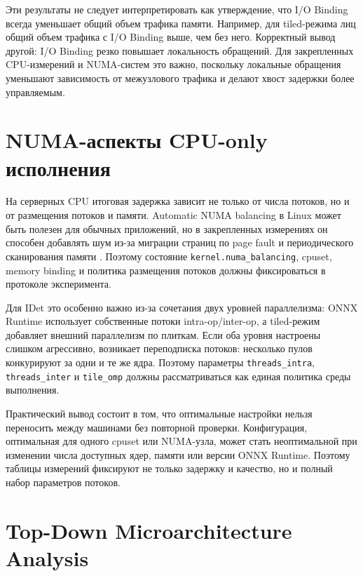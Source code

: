 \documentclass[12pt,a4paper,oneside,openany]{report}
\begin{document}
Эти результаты не следует интерпретировать как утверждение, что I/O Binding всегда уменьшает общий объем трафика памяти. Например, для tiled-режима лиц общий объем трафика с I/O Binding выше, чем без него. Корректный вывод другой: I/O Binding резко повышает локальность обращений. Для закрепленных CPU-измерений и NUMA-систем это важно, поскольку локальные обращения уменьшают зависимость от межузлового трафика и делают хвост задержки более управляемым.


\section{NUMA-аспекты CPU-only исполнения}

На серверных CPU итоговая задержка зависит не только от числа потоков, но и от размещения потоков и памяти. Automatic NUMA balancing в Linux может быть полезен для обычных приложений, но в закрепленных измерениях он способен добавлять шум из-за миграции страниц по page fault и периодического сканирования памяти \cite{linux_numa_balancing}. Поэтому состояние \texttt{kernel.numa\_balancing}, cpuset, memory binding и политика размещения потоков должны фиксироваться в протоколе эксперимента.

Для IDet это особенно важно из-за сочетания двух уровней параллелизма: ONNX Runtime использует собственные потоки intra-op/inter-op, а tiled-режим добавляет внешний параллелизм по плиткам. Если оба уровня настроены слишком агрессивно, возникает переподписка потоков: несколько пулов конкурируют за одни и те же ядра. Поэтому параметры \texttt{threads\_intra}, \texttt{threads\_inter} и \texttt{tile\_omp} должны рассматриваться как единая политика среды выполнения.

Практический вывод состоит в том, что оптимальные настройки нельзя переносить между машинами без повторной проверки. Конфигурация, оптимальная для одного cpuset или NUMA-узла, может стать неоптимальной при изменении числа доступных ядер, памяти или версии ONNX Runtime. Поэтому таблицы измерений фиксируют не только задержку и качество, но и полный набор параметров потоков.


\section{Top-Down Microarchitecture Analysis}
\end{document}
